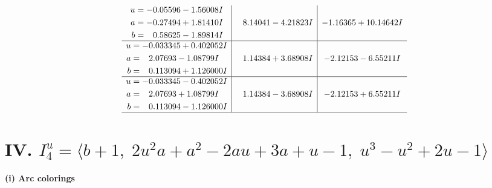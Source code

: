 \documentclass[1p]{elsarticle_modified}
\theoremstyle{definition}
\begin{document}
$$\begin{array}{c|c|c}
\begin{aligned}
u &= -0.05596 - 1.56008 I \\
a &= -0.27494 + 1.81410 I \\
b &= \phantom{-}0.58625 - 1.89814 I\end{aligned}
 & \phantom{-}8.14041 - 4.21823 I & -1.16365 + 10.14642 I \\ \hline\begin{aligned}
u &= -0.033345 + 0.402052 I \\
a &= \phantom{-}2.07693 - 1.08799 I \\
b &= \phantom{-}0.113094 + 1.126000 I\end{aligned}
 & \phantom{-}1.14384 + 3.68908 I & -2.12153 - 6.55211 I \\ \hline\begin{aligned}
u &= -0.033345 - 0.402052 I \\
a &= \phantom{-}2.07693 + 1.08799 I \\
b &= \phantom{-}0.113094 - 1.126000 I\end{aligned}
 & \phantom{-}1.14384 - 3.68908 I & -2.12153 + 6.55211 I\\
 \hline 
 \end{array}$$\newpage\newpage\renewcommand{\arraystretch}{1}
\centering \section*{IV. $I^u_{4}= \langle b+1,\;2 u^2 a+a^2-2 a u+3 a+u-1,\;u^3- u^2+2 u-1 \rangle$}
\flushleft \textbf{(i) Arc colorings}\\
\end{document}
